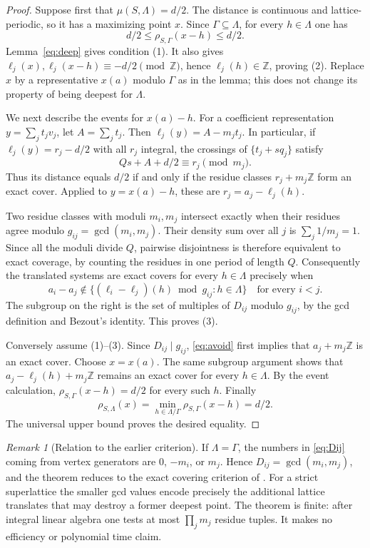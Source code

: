 \documentclass[11pt,a4paper]{article}
\theoremstyle{remark}\newtheorem{remark}[theorem]{Remark}
\begin{document}
\begin{proof}
Suppose first that $\mu(S,\Lambda)=d/2$. The distance is continuous
and lattice-periodic, so it has a maximizing point $x$. Since
$\Gamma\subseteq\Lambda$, for every $h\in\Lambda$ one has
\[
 d/2\le\rho_{S,\Gamma}(x-h)\le d/2.
\]
Lemma~\ref{eq:deep} gives condition (1). It also gives
$\ell_j(x),\ell_j(x-h)\equiv-d/2\pmod{\mathbb Z}$, hence
$\ell_j(h)\in\mathbb Z$, proving (2).
Replace $x$ by a representative $x(a)$ modulo $\Gamma$ as in
the lemma; this does not change its property of being deepest
for $\Lambda$.

We next describe the events for $x(a)-h$. For a coefficient
representation $y=\sum_jt_jv_j$, let $A=\sum_jt_j$. Then
$\ell_j(y)=A-m_jt_j$. In particular, if
$\ell_j(y)=r_j-d/2$ with all $r_j$ integral, the crossings of
$\{t_j+s q_j\}$ satisfy
\[
 Qs+A+d/2\equiv r_j\pmod{m_j}.
\]
Thus its distance equals $d/2$ if and only if the residue classes
$r_j+m_j\mathbb Z$ form an exact cover. Applied to $y=x(a)-h$,
these are $r_j=a_j-\ell_j(h)$.

Two residue classes with moduli $m_i,m_j$ intersect exactly when
their residues agree modulo $g_{ij}=\gcd(m_i,m_j)$. Their density
sum over all $j$ is $\sum_j1/m_j=1$. Since all the moduli divide
$Q$, pairwise disjointness is therefore equivalent to exact
coverage, by counting the residues in one period of length $Q$.
Consequently the translated systems are exact covers for every
$h\in\Lambda$ precisely when
\[
 a_i-a_j\notin
 \{(\ell_i-\ell_j)(h)\bmod g_{ij}:h\in\Lambda\}
 \quad\text{for every }i<j.
\]
The subgroup on the right is the set of multiples of $D_{ij}$
modulo $g_{ij}$, by the gcd definition and Bezout's identity.
This proves (3).

Conversely assume (1)--(3). Since $D_{ij}\mid g_{ij}$,
\eqref{eq:avoid} first implies that $a_j+m_j\mathbb Z$ is an exact
cover. Choose $x=x(a)$. The same subgroup argument shows that
$a_j-\ell_j(h)+m_j\mathbb Z$ remains an exact cover for every
$h\in\Lambda$. By the event calculation,
$\rho_{S,\Gamma}(x-h)=d/2$ for every such $h$. Finally
\[
 \rho_{S,\Lambda}(x)
 =\min_{h\in\Lambda/\Gamma}\rho_{S,\Gamma}(x-h)=d/2.
\]
The universal upper bound proves the desired equality.
\end{proof}

\begin{remark}[Relation to the earlier criterion]\label{eq:relation}
If $\Lambda=\Gamma$, the numbers in \eqref{eq:Dij} coming from
vertex generators are $0$, $-m_i$, or $m_j$. Hence
$D_{ij}=\gcd(m_i,m_j)$, and the theorem reduces to the exact
covering criterion of \cite{VMRC200}. For a strict superlattice
the smaller gcd values encode precisely the additional lattice
translates that may destroy a former deepest point. The theorem
is finite: after integral linear algebra one tests at most
$\prod_jm_j$ residue tuples. It makes no efficiency or polynomial
time claim.
\end{remark}
\end{document}
